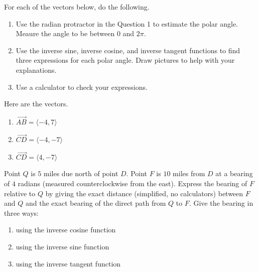 \documentclass{ximera}
\begin{document}
\begin{question}  \label{Q9DDFegbb}
For each of the vectors below, do the following.

\begin{enumerate}
\item Use the radian protractor in the Question 1 to estimate the polar angle. Meaure the angle to be between $0$ and $2\pi$.

\item Use the inverse sine, inverse cosine, and inverse tangent functions to find three expressions for each polar angle. Draw pictures to help with your explanations.

\item Use a calculator to check your expressions.

\end{enumerate}

Here are the vectors.

\begin{enumerate}
\item $\overrightarrow{AB} = \langle -4, 7 \rangle$

\item $\overrightarrow{CD} = \langle -4, -7 \rangle$

\item $\overrightarrow{CD} = \langle 4, -7 \rangle$

\end{enumerate}
\end{question}

\begin{question} \label{QEggdR34rRER}
Point $Q$ is $5$ miles due north of point $D$. Point $F$ is $10$ miles from $D$ at a bearing of $4$ radians (measured counterclockwise from the east). Express the bearing of $F$ relative to $Q$ by giving the exact distance (simplified, no calculators) between $F$ and $Q$ and the exact bearing of the direct path from $Q$ to $F$. Give the bearing in three ways:

\begin{enumerate}
\item using the inverse cosine function

\item using the inverse sine function

\item using the inverse tangent function

\end{enumerate}
\end{question}
\end{document}
